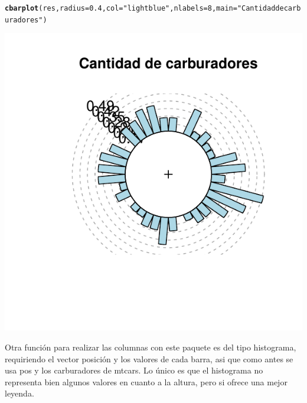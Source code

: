 \documentclass{article}\usepackage[]{graphicx}\usepackage[]{color}
\makeatletter
\def\maxwidth{ %
  \ifdim\Gin@nat@width>\linewidth
    \linewidth
  \else
    \Gin@nat@width
  \fi
}
\newcommand{\hlnum}[1]{\textcolor[rgb]{0.686,0.059,0.569}{#1}}%
\newcommand{\hlstr}[1]{\textcolor[rgb]{0.192,0.494,0.8}{#1}}%
\newcommand{\hlstd}[1]{\textcolor[rgb]{0.345,0.345,0.345}{#1}}%
\newcommand{\hlkwc}[1]{\textcolor[rgb]{0.333,0.667,0.333}{#1}}%
\newcommand{\hlkwd}[1]{\textcolor[rgb]{0.737,0.353,0.396}{\textbf{#1}}}%
\newenvironment{kframe}{%
 \def\at@end@of@kframe{}%
 \ifinner\ifhmode%
  \def\at@end@of@kframe{\end{minipage}}%
  \begin{minipage}{\columnwidth}%
 \fi\fi%
 \def\FrameCommand##1{\hskip\@totalleftmargin \hskip-\fboxsep
 \colorbox{shadecolor}{##1}\hskip-\fboxsep
     \hskip-\linewidth \hskip-\@totalleftmargin \hskip\columnwidth}%
 \MakeFramed {\advance\hsize-\width
   \@totalleftmargin\z@ \linewidth\hsize
   \@setminipage}}%
 {\par\unskip\endMakeFramed%
 \at@end@of@kframe}
\newenvironment{knitrout}{}{} %
\makeatother
\begin{document}
\begin{knitrout}
\color{fgcolor}\begin{kframe}
\begin{alltt}
\hlkwd{cbarplot}\hlstd{(res,} \hlkwc{radius}\hlstd{=}\hlnum{0.4}\hlstd{,} \hlkwc{col}\hlstd{=}\hlstr{"lightblue"}\hlstd{,} \hlkwc{nlabels} \hlstd{=} \hlnum{8}\hlstd{,} \hlkwc{main} \hlstd{=} \hlstr{"Cantidad de carburadores"}\hlstd{)}
\end{alltt}
\end{kframe}

{\centering \includegraphics[width=\maxwidth]{figure/plot_cplots_cr-1} 

}



\end{knitrout}
Otra funci\'on para realizar las columnas con este paquete es del tipo histograma, requiriendo el vector posici\'on y los valores de cada barra, asi que como antes se usa pos y los carburadores de mtcars. Lo \'unico es que el histograma no representa bien algunos valores en cuanto a la altura, pero si ofrece una mejor leyenda.
\end{document}
